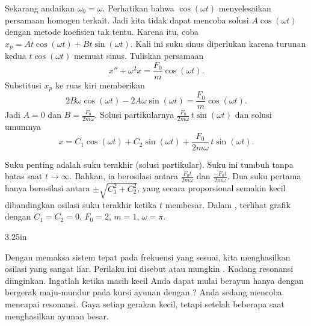 Sekarang andaikan $\omega_0 = \omega$. Perhatikan bahwa $\cos (\omega t)$ menyelesaikan persamaan homogen terkait. Jadi kita tidak dapat mencoba solusi $A \cos (\omega t)$ dengan metode koefisien tak tentu. Karena itu, coba $x_p = A t \cos (\omega t) + B t \sin (\omega t)$. Kali ini suku sinus diperlukan karena turunan kedua $t \cos (\omega t)$ memuat sinus. Tuliskan persamaan
\begin{equation*}
x'' + \omega^2 x = \frac{F_0}{m} \cos ( \omega t) .
\end{equation*}
Substitusi $x_p$ ke ruas kiri memberikan
\begin{equation*}
2 B \omega \cos (\omega t) - 2 A \omega \sin (\omega t) =
\frac{F_0}{m} \cos (\omega t) .
\end{equation*}
Jadi $A = 0$ dan $B = \frac{F_0}{2m\omega}$. Solusi partikularnya $\frac{F_0}{2m\omega} \, t \sin (\omega t)$ dan solusi umumnya
\begin{equation*}
x = C_1 \cos (\omega t) + C_2 \sin (\omega t)
+ \frac{F_0}{2m\omega} \, t \sin (\omega t) .
\end{equation*}

Suku penting adalah suku terakhir (solusi partikular). Suku ini tumbuh tanpa batas saat $t \to \infty$. Bahkan, ia berosilasi antara $\frac{F_0 t}{2m\omega}$ dan $\frac{- F_0 t}{2m\omega}$. Dua suku pertama hanya berosilasi antara $\pm\sqrt{C_1^2 + C_2^2}$, yang secara proporsional semakin kecil dibandingkan osilasi suku terakhir ketika $t$ membesar. Dalam , terlihat grafik dengan $C_1=C_2=0$, $F_0 = 2$, $m=1$, $\omega = \pi$.

\begin{mywrapfig}{3.25in}
\capstart
{}
\caption{Grafik
$\frac{1}{\pi} t \sin (\pi t)$.\label{3.6:resonancefig}}
\end{mywrapfig}

Dengan memaksa sistem tepat pada frekuensi yang sesuai, kita menghasilkan osilasi yang sangat liar. Perilaku ini disebut \emph{} atau mungkin \emph{}. Kadang resonansi diinginkan. Ingatlah ketika masih kecil Anda dapat mulai berayun hanya dengan bergerak maju-mundur pada kursi ayunan dengan ? Anda sedang mencoba mencapai resonansi. Gaya setiap gerakan kecil, tetapi setelah beberapa saat menghasilkan ayunan besar.

